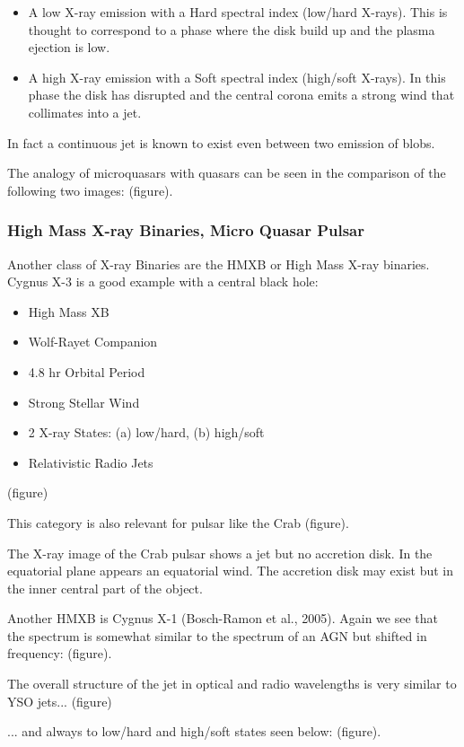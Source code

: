 \documentclass[10pt,a4paper,english,draft]{article}
\begin{document}
\begin{itemize}
\item A low X-ray emission with a Hard spectral index (low/hard X-rays). This is thought to correspond to a phase where the disk build up and the plasma ejection is low.
\item A high X-ray emission with a Soft spectral index (high/soft X-rays). In this phase the disk has disrupted and the central corona emits a strong wind that collimates into a jet.
\end{itemize}

In fact a continuous jet is known to exist even between two emission of blobs.

The analogy of microquasars with quasars can be seen in the comparison of the following two images: (figure).

\subsubsection{High Mass X-ray Binaries, Micro Quasar Pulsar}
Another class of X-ray Binaries are the HMXB or High Mass X-ray binaries. Cygnus X-3 is a good example with a central black hole:
\begin{itemize}
\item High Mass XB
\item Wolf-Rayet Companion
\item 4.8 hr Orbital Period
\item Strong Stellar Wind
\item 2 X-ray States: (a) low/hard, (b) high/soft
\item Relativistic Radio Jets
\end{itemize}

(figure)

This category is also relevant for pulsar like the Crab (figure).

The X-ray image of the Crab pulsar shows a jet but no accretion disk. In the equatorial plane appears an equatorial wind. The accretion disk may exist but in the inner central part of the object.

Another HMXB is Cygnus X-1 (Bosch-Ramon et al., 2005). Again we see that the spectrum is somewhat similar to the spectrum of an AGN but shifted in frequency: (figure).

The overall structure of the jet in optical and radio wavelengths is very similar to YSO jets... (figure)

... and always to low/hard and high/soft states seen below: (figure).
\end{document}

